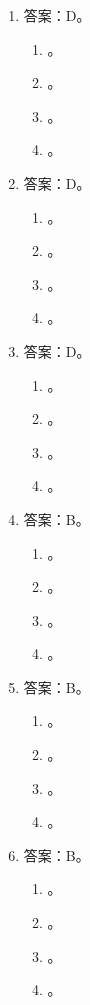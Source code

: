 \begin{enumerate}
\item 答案：D。
	\begin{enumerate}[label=\Alph*.]
	\item 。
	\item 。
	\item 。
	\item 。
	\end{enumerate}

\item 答案：D。
	\begin{enumerate}[label=\Alph*.]
	\item 。
	\item 。
	\item 。
	\item 。
	\end{enumerate}

\item 答案：D。
	\begin{enumerate}[label=\Alph*.]
	\item 。
	\item 。
	\item 。
	\item 。
	\end{enumerate}

\item 答案：B。
	\begin{enumerate}[label=\Alph*.]
	\item 。
	\item 。
	\item 。
	\item 。
	\end{enumerate}

\item 答案：B。
	\begin{enumerate}[label=\Alph*.]
	\item 。
	\item 。
	\item 。
	\item 。
	\end{enumerate}

\item 答案：B。
	\begin{enumerate}[label=\Alph*.]
	\item 。
	\item 。
	\item 。
	\item 。
	\end{enumerate}


\end{enumerate}
